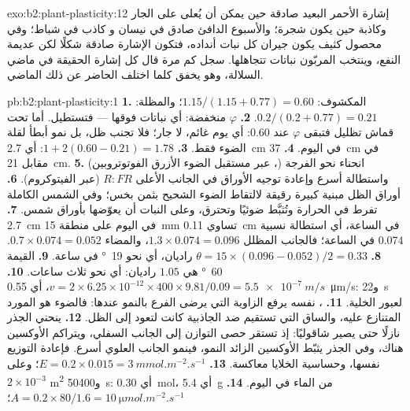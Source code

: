 \begin{solution}{exo:b2:plant-plasticity:12}
إشارة الأحمر البعيد صادقة حين يمكن أن يُعلى على الجار
وكاذبة حين يكون شجرة؛ والأسبوع الدافئ صادق في نيسان و
كاذب في شباط؛ وفي محصول كثيف يكون جيران كل نبات
أنداده، فتكون الإشارة صادقة شكلًا لكن عديمة النفع، وينتخب المربّون
نباتات تتجاهلها.  سجل
كم مرة قال كل إشارة الحقيقة في ماضي السلالة، وهو
يخفق كلما اختلف الحاضر عن ذلك الماضي.
\end{solution}

\begin{solution}{pb:b2:plant-plasticity:1}
\textbf{1.} المكشوف: $1.15/(1.15 + 0.77) = 0.60$؛ والمظلة: $0.2/(0.2 +
0.77) = 0.21$.
\textbf{2.} $\varphi$ منخفضة: أي نباتات فوقها --- فتستطيل. أما تحت
قماش تظليل فتبقى $\varphi$ عند $0.60$: أي يوم غائم، لا جار؛ فلا
تجنب ظل، بل نمو أبطأ لقلة الضوء فقط.
\textbf{3.} $1 + 2(0.60 - 0.21) = 1.78$: أي \qty{2.7}{cm} في اليوم.
\textbf{4.} \qty{37}{cm} في مقابل \qty{21}{cm}.
\textbf{5.} انحناء نحو الفرجة (، عبر مستقبل الضوء
الأزرق الفوتوتروبين) واستطالة أسرع وإعادة توجيه الأوراق
في الجانب الأعلى $R{:}FR$ (عبر الفيتوكروم).
\textbf{6.} أوراق الظل مبنية كبيرة رقيقة لالتقاط الضوء
الشحيح بثمن بخس؛ وفي الشمس الكاملة تفرط في الحرارة وتُثبَّط ضوئيًا وتحترق،
وعلى النبات أن يعوّضها بأوراق شمس.
\textbf{7.} \qty{2.7}{cm} في اليوم على منطقة \qty{15}{mm} تساوي
\qty{0.11}{cm} في الساعة، أي استطالة نسبية $0.074$ في الساعة؛
فالجانب المظلل $1.3\times 0.074 = 0.096$، والمضاء $0.7\times 0.074 =
0.052$.
\textbf{8.} $\theta = 15\times(0.096 - 0.052)/2 = 0.33$ راديان، أي نحو
\qty{19}{\degree} في ساعة.
\textbf{9.} القيمة \qty{60}{\degree} هي $1.05$ راديان: أي نحو ثلاث ساعات.
\textbf{10.} $v = 2\times 6.25\times 10^{-12}\times 400\times
9.81/0.09 = \qty{5.5e-7}{m/s}$، أي \qty{0.55}{\micro m/s}: و\qty{22}{s}
لعبور الخلية.
\textbf{11.} ،  نفسه يرفع
الزاوية التي يرضى الفرع بالنمو عندها: فالضوء هو المورد
المتنازع عليه، والساق التي تستقيم ضد الجاذبية كانت
لتعود إلى الظل.
\textbf{12.} ينحني الجذر نازلًا حتى يصير شاقوليًا: إذ تستقر حصى التوازن
إلى الجانب السفلي، ويتراكم الأوكسين هناك، وفي الجذر
يثبّط الأوكسين الزائد النمو، فينمو الجانب العلوي أسرع. فإعادة
التوزيع نفسها، وحساسية الخلايا معاكسة.
\textbf{13.} $E = 0.2\times 0.015 = \qty{3}{mmol.m^{-2}.s^{-1}}$؛ وعلى
$2\times 10^{-3}$ \unit{m^2} و\qty{50400}{s}: أي \qty{0.30}{mol}،
أي \qty{5.4}{g} من الماء في اليوم.
\textbf{14.} $A = 0.2\times 80/1.6 = \qty{10}{\micro mol.m^{-2}.s^{-1}}$؛

\end{solution}
